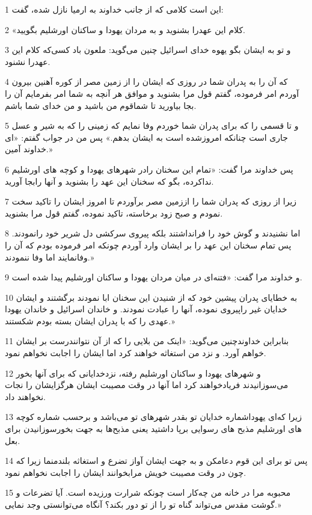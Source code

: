 \par 1 این است کلامی که از جانب خداوند به ارمیا نازل شده، گفت:
\par 2 «کلام این عهدرا بشنوید و به مردان یهودا و ساکنان اورشلیم بگویید.
\par 3 و تو به ایشان بگو یهوه خدای اسرائیل چنین می‌گوید: ملعون باد کسی‌که کلام این عهدرا نشنود.
\par 4 که آن را به پدران شما در روزی که ایشان را از زمین مصر از کوره آهنین بیرون آوردم امر فرموده، گفتم قول مرا بشنوید و موافق هر آنچه به شما امر بفرمایم آن را بجا بیاورید تا شماقوم من باشید و من خدای شما باشم.
\par 5 و تا قسمی را که برای پدران شما خوردم وفا نمایم که زمینی را که به شیر و عسل جاری است چنانکه امروزشده است به ایشان بدهم.» پس من در جواب گفتم: «ای خداوند آمین.»
\par 6 پس خداوند مرا گفت: «تمام این سخنان رادر شهرهای یهودا و کوچه های اورشلیم نداکرده، بگو که سخنان این عهد را بشنوید و آنها رابجا آورید.
\par 7 زیرا از روزی که پدران شما را اززمین مصر برآوردم تا امروز ایشان را تاکید سخت نمودم و صبح زود برخاسته، تاکید نموده، گفتم قول مرا بشنوید.
\par 8 اما نشنیدند و گوش خود را فرانداشتند بلکه پیروی سرکشی دل شریر خود رانمودند. پس تمام سخنان این عهد را بر ایشان وارد آوردم چونکه امر فرموده بودم که آن را وفانمایند اما وفا ننمودند.»
\par 9 و خداوند مرا گفت: «فتنه‌ای در میان مردان یهودا و ساکنان اورشلیم پیدا شده است.
\par 10 به خطایای پدران پیشین خود که از شنیدن این سخنان ابا نمودند برگشتند و ایشان خدایان غیر راپیروی نموده، آنها را عبادت نمودند. و خاندان اسرائیل و خاندان یهودا عهدی را که با پدران ایشان بسته بودم شکستند.»
\par 11 بنابراین خداوندچنین می‌گوید: «اینک من بلایی را که از آن نتوانندرست بر ایشان خواهم آورد. و نزد من استغاثه خواهند کرد اما ایشان را اجابت نخواهم نمود.
\par 12 و شهرهای یهودا و ساکنان اورشلیم رفته، نزدخدایانی که برای آنها بخور می‌سوزانیدند فریادخواهند کرد اما آنها در وقت مصیبت ایشان هرگزایشان را نجات نخواهند داد.
\par 13 زیرا که‌ای یهوداشماره خدایان تو بقدر شهرهای تو می‌باشد و برحسب شماره کوچه های اورشلیم مذبح های رسوایی برپا داشتید یعنی مذبح‌ها به جهت بخورسوزانیدن برای بعل.
\par 14 پس تو برای این قوم دعامکن و به جهت ایشان آواز تضرع و استغاثه بلندمنما زیرا که چون در وقت مصیبت خویش مرابخوانند ایشان را اجابت نخواهم نمود.
\par 15 محبوبه مرا در خانه من چه‌کار است چونکه شرارت ورزیده است. آیا تضرعات و گوشت مقدس می‌تواند گناه تو را از تو دور بکند؟ آنگاه می‌توانستی وجد نمایی.»

